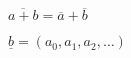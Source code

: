 \documentclass[nofonts]{ctexbook}
\begin{document}
	$ \overline{a + b} = \overline{a} + \overline{b} $

	$ \underline{b} = (a_0, a_1, a_2, \dots) $
\end{document}
